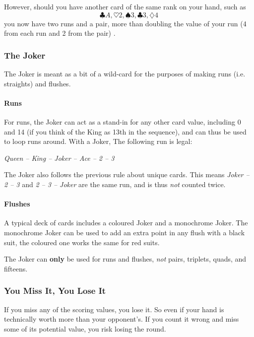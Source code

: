However, should you have another card of the same rank on your hand, such as \[\clubsuit A, \heartsuit 2, \spadesuit 3, \clubsuit 3, \diamondsuit 4\] you now have two runs and a pair, more than doubling the value of your run (4 from each run and 2 from the pair) .

\subsubsection{The Joker}
The Joker is meant as a bit of a wild-card for the purposes of making runs (i.e. straights) and flushes.

\paragraph{Runs} For runs, the Joker can act as a stand-in for any other card value, including 0 and 14 (if you think of the King as 13th in the sequence), and can thus be used to loop runs around. 
With a Joker, The following run is legal:
\begin{center}
    \textit{Queen -- King -- Joker -- Ace -- 2 -- 3}
\end{center}

The Joker also follows the previous rule about unique cards.
This means \textit{Joker -- 2 -- 3} and \textit{2 -- 3 -- Joker} are the same run, and is thus \textit{not} counted twice.

\paragraph{Flushes} A typical deck of cards includes a coloured Joker and a monochrome Joker. 
The monochrome Joker can be used to add an extra point in any flush with a black suit, the coloured one works the same for red suits.

\note The Joker can \textbf{only} be used for runs and flushes, \textit{not} pairs, triplets, quads, and fifteens.

\subsubsection{You Miss It, You Lose It}
If you miss any of the scoring values, you lose it. So even if your hand is technically worth more than your opponent's. If you count it wrong and miss some of its potential value, you risk losing the round.

